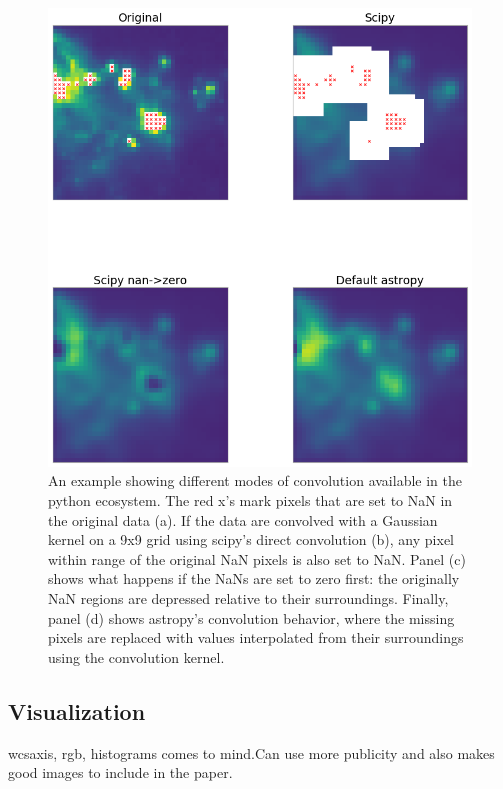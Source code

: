 \documentclass[modern]{aastex61}
\begin{document}
\begin{figure}
\includegraphics[width=\textwidth]{convolution_example.png}
An example showing different modes of convolution available in the python ecosystem.  The red x's mark pixels that are set to NaN in the original data (a).  If the data are convolved with a Gaussian kernel on a 9x9 grid using scipy's direct convolution (b), any pixel within range of the original NaN pixels is also set to NaN.  Panel (c) shows what happens if the NaNs are set to zero first: the originally NaN regions are depressed relative to their surroundings.  Finally, panel (d) shows astropy's convolution behavior, where the missing pixels are replaced with values interpolated from their surroundings using the convolution kernel.
\end{figure}


\subsection{Visualization}

wcsaxis, rgb, histograms comes to mind.Can use more publicity and also makes good images to include in the paper.
\end{document}
